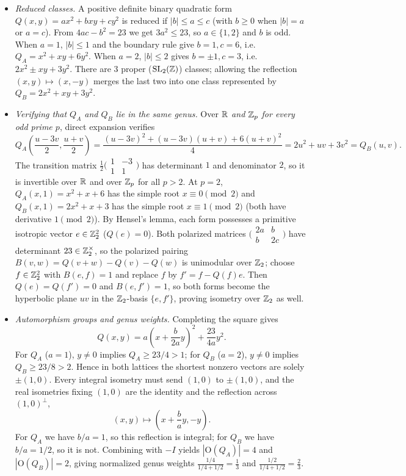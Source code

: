 \begin{itemize}
\item \emph{Reduced classes.} A positive definite binary quadratic form $Q(x,y)=ax^2+bxy+cy^2$ is reduced if $|b|\le a\le c$ (with $b\ge 0$ when $|b|=a$ or $a=c$). From $4ac-b^2=23$ we get $3a^2\le 23$, so $a\in\{1,2\}$ and $b$ is odd. When $a=1$, $|b|\le 1$ and the boundary rule give $b=1,c=6$, i.e.\ $Q_A=x^2+xy+6y^2$. When $a=2$, $|b|\le 2$ gives $b=\pm 1,c=3$, i.e.\ $2x^2\pm xy+3y^2$. There are $3$ proper ($\operatorname{SL}_2(\mathbb{Z})$) classes; allowing the reflection $(x,y)\mapsto(x,-y)$ merges the last two into one class represented by $Q_B=2x^2+xy+3y^2$.

\item \emph{Verifying that $Q_A$ and $Q_B$ lie in the same genus.} Over \emph{$\mathbb{R}$ and $\mathbb{Z}_p$ for every odd prime $p$}, direct expansion verifies
\[
Q_A\!\left(\frac{u-3v}{2},\frac{u+v}{2}\right)=\frac{(u-3v)^2+(u-3v)(u+v)+6(u+v)^2}{4}=2u^2+uv+3v^2=Q_B(u,v).
\]
The transition matrix $\frac{1}{2}\bigl(\begin{smallmatrix}1&-3\\1&1\end{smallmatrix}\bigr)$ has determinant $1$ and denominator $2$, so it is invertible over $\mathbb{R}$ and over $\mathbb{Z}_p$ for all $p>2$. At \emph{$p=2$}, $Q_A(x,1)=x^2+x+6$ has the simple root $x\equiv 0\pmod 2$ and $Q_B(x,1)=2x^2+x+3$ has the simple root $x\equiv 1\pmod 2$ (both have derivative $1\pmod 2$). By Hensel's lemma, each form possesses a primitive isotropic vector $e\in\mathbb{Z}_2^2$ ($Q(e)=0$). Both polarized matrices $\bigl(\begin{smallmatrix}2a&b\\b&2c\end{smallmatrix}\bigr)$ have determinant $23\in\mathbb{Z}_2^\times$, so the polarized pairing $B(v,w)=Q(v+w)-Q(v)-Q(w)$ is unimodular over $\mathbb{Z}_2$; choose $f\in\mathbb{Z}_2^2$ with $B(e,f)=1$ and replace $f$ by $f'=f-Q(f)e$. Then $Q(e)=Q(f')=0$ and $B(e,f')=1$, so both forms become the hyperbolic plane $uv$ in the $\mathbb{Z}_2$-basis $\{e,f'\}$, proving isometry over $\mathbb{Z}_2$ as well.

\item \emph{Automorphism groups and genus weights.} Completing the square gives
\[
Q(x,y)=a\left(x+\frac{b}{2a}y\right)^2+\frac{23}{4a}y^2.
\]
For $Q_A$ ($a=1$), $y\ne 0$ implies $Q_A\ge 23/4>1$; for $Q_B$ ($a=2$), $y\ne 0$ implies $Q_B\ge 23/8>2$. Hence in both lattices the shortest nonzero vectors are solely $\pm(1,0)$. Every integral isometry must send $(1,0)$ to $\pm(1,0)$, and the real isometries fixing $(1,0)$ are the identity and the reflection across $(1,0)^\perp$,
\[
(x,y)\longmapsto\left(x+\frac{b}{a}y,-y\right).
\]
For $Q_A$ we have $b/a=1$, so this reflection is integral; for $Q_B$ we have $b/a=1/2$, so it is not. Combining with $-I$ yields $|\mathrm O(Q_A)|=4$ and $|\mathrm O(Q_B)|=2$, giving normalized genus weights $\frac{1/4}{1/4+1/2}=\frac{1}{3}$ and $\frac{1/2}{1/4+1/2}=\frac{2}{3}$.
\end{itemize}
